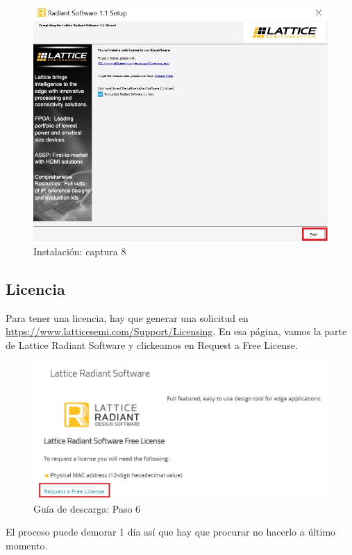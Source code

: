 \documentclass{article}
\begin{document}
\begin{figure}[H]
\centering
\includegraphics[width=0.8\linewidth]{images/inst8.JPG}
\caption{Instalación: captura 8 }
\label{fig:install}
\end{figure}



\subsection{Licencia}
Para tener una licencia, hay que generar una solicitud en
\href{https://www.latticesemi.com/Support/Licensing}{https://www.latticesemi.com/Support/Licensing}.
En esa página, vamos la parte de Lattice Radiant Software y clickeamos en Request a Free License.

\begin{figure}[H]
\centering
\includegraphics[width=1\linewidth]{images/6.JPG}
\caption{Guía de descarga: Paso 6}
\label{fig:step6}
\end{figure}

El proceso puede demorar 1 día así que hay que procurar no hacerlo a último momento.
\end{document}
